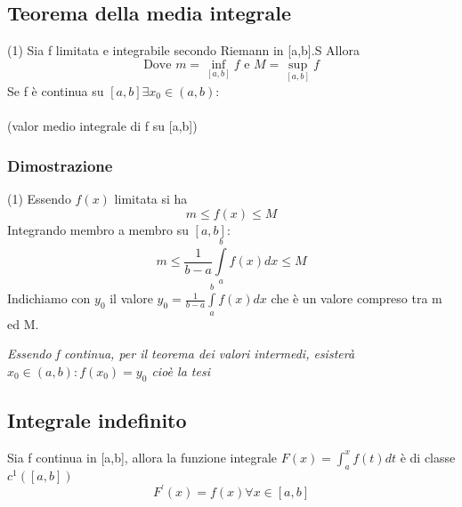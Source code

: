 \documentclass{book}
\begin{document}
\subsection{Teorema della media integrale}
\begin{tasks}(1)
	\task Sia f limitata e integrabile secondo Riemann in [a,b].S Allora\\
	 \begin{equation*} \text{Dove } m=\operatorname*{\inf}_{[a,b]} f \text{ e } M=\operatorname*{sup}_{[a,b]} f\end{equation*}
	\task Se f è continua su $[a,b] \exists x_0 \in (a,b)$:\\
	\\(valor medio integrale di f su [a,b])
\end{tasks}
\subsubsection{Dimostrazione}
\begin{tasks}(1)
	\task Essendo $f(x)$ limitata si ha
		\begin{equation*}
			m\leq f(x)\leq M
		\end{equation*}
		Integrando membro a membro su $[a,b]$:
		\begin{equation*}
			m\leq \frac{1}{b-a}\int\limits_a^b f(x)dx\leq M
		\end{equation*}
	\task Indichiamo con $y_0$ il valore $y_0=\frac{1}{b-a}\int\limits_a^b f(x)dx$ che è un valore compreso tra m ed M.
\end{tasks}
\textit{Essendo f continua, per il teorema dei valori intermedi, esisterà $x_0\in (a,b): f(x_0)=y_0$ cioè la tesi}
\subsection{Integrale indefinito}
Sia f continua in [a,b], allora la funzione integrale $F(x)=\int^x_af(t)dt$ è di classe $c^1([a,b])$
\begin{equation*}
	F^\prime (x)=f(x) \forall x \in [a,b]
\end{equation*}
\end{document}

